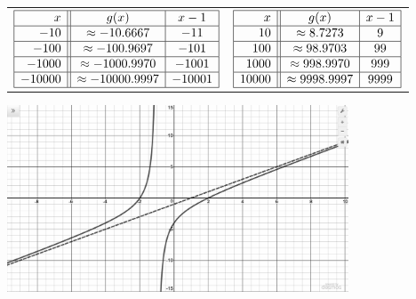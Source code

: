 \begin{center}
\begin{tabular}{cc}

$\begin{array}{|r||c|c|}  \hline

  x & g(x) & x-1 \\ \hline
 -10 & \approx -10.6667 & -11 \\  \hline
 -100 & \approx -100.9697 & -101 \\  \hline 
 -1000 &  \approx -1000.9970&   -1001 \\ \hline 
  -10000 &  \approx -10000.9997 &  -10001 \\ \hline 
  \end{array} $ & 

$\begin{array}{|r||c|c|}  \hline

  x & g(x) & x-1 \\ \hline
 10 & \approx 8.7273 &    9 \\\hline
 100 & \approx 98.9703 &   99 \\ \hline 
 1000 &  \approx 998.9970 &  999 \\ \hline 
  10000 &  \approx 9998.9997 &   9999 \\ \hline 
  \end{array} $ \\
  
  \end{tabular}
  \end{center}
  
  
\begin{center}
   
\includegraphics[width=4in]{./IntroRationalGraphics/SAEx01.jpg}

\end{center}
 
